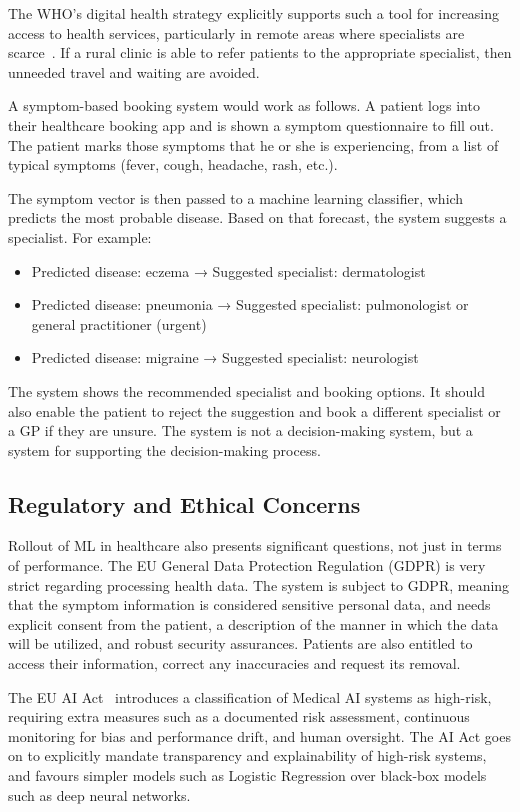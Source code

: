 The WHO's digital health strategy explicitly supports such a tool for increasing access to health services, particularly in remote areas where specialists are scarce~\citep{WHO2021}. If a rural clinic is able to refer patients to the appropriate specialist, then unneeded travel and waiting are avoided.

A symptom-based booking system would work as follows. A patient logs into their healthcare booking app and is shown a symptom questionnaire to fill out. The patient marks those symptoms that he or she is experiencing, from a list of typical symptoms (fever, cough, headache, rash, etc.).

The symptom vector is then passed to a machine learning classifier, which predicts the most probable disease. Based on that forecast, the system suggests a specialist. For example:

\begin{itemize}
    \item Predicted disease: eczema → Suggested specialist: dermatologist
    \item Predicted disease: pneumonia → Suggested specialist: pulmonologist or general practitioner (urgent)
    \item Predicted disease: migraine → Suggested specialist: neurologist
\end{itemize}

The system shows the recommended specialist and booking options. It should also enable the patient to reject the suggestion and book a different specialist or a GP if they are unsure. The system is not a decision-making system, but a system for supporting the decision-making process.

\subsection{Regulatory and Ethical Concerns}

Rollout of ML in healthcare also presents significant questions, not just in terms of performance. The EU General Data Protection Regulation (GDPR) is very strict regarding processing health data. The system is subject to GDPR, meaning that the symptom information is considered sensitive personal data, and needs explicit consent from the patient, a description of the manner in which the data will be utilized, and robust security assurances. Patients are also entitled to access their information, correct any inaccuracies and request its removal.

The EU AI Act~\citep{EUAI2024} introduces a classification of Medical AI systems as high-risk, requiring extra measures such as a documented risk assessment, continuous monitoring for bias and performance drift, and human oversight. The AI Act goes on to explicitly mandate transparency and explainability of high-risk systems, and favours simpler models such as Logistic Regression over black-box models such as deep neural networks.


